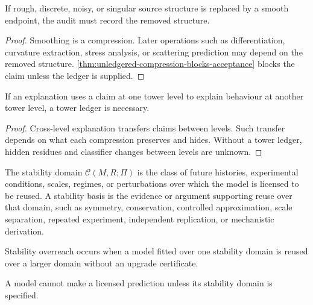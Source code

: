 \begin{corollary}
\label{cor:smooth-endpoints-source-ledgers}
If rough, discrete, noisy, or singular source structure is replaced by a smooth endpoint, the audit must record the removed structure.
\end{corollary}

\begin{proof}
Smoothing is a compression. Later operations such as differentiation, curvature extraction, stress analysis, or scattering prediction may depend on the removed structure. \autoref{thm:unledgered-compression-blocks-acceptance} blocks the claim unless the ledger is supplied.
\end{proof}

\begin{theorem}
\label{thm:tower-ledger-necessary-cross-level-explanation}
If an explanation uses a claim at one tower level to explain behaviour at another tower level, a tower ledger is necessary.
\end{theorem}

\begin{proof}
Cross-level explanation transfers claims between levels. Such transfer depends on what each compression preserves and hides. Without a tower ledger, hidden residues and classifier changes between levels are unknown.
\end{proof}

\begin{definition}
\label{def:stability-domain-basis}
The stability domain $\mathcal C(M,R;\Pi)$ is the class of future histories, experimental conditions, scales, regimes, or perturbations over which the model is licensed to be reused. A stability basis is the evidence or argument supporting reuse over that domain, such as symmetry, conservation, controlled approximation, scale separation, repeated experiment, independent replication, or mechanistic derivation.
\end{definition}

\begin{definition}
\label{def:stability-overreach}
Stability overreach occurs when a model fitted over one stability domain is reused over a larger domain without an upgrade certificate.
\end{definition}

\begin{theorem}
\label{thm:prediction-requires-stability-domain-audit}
A model cannot make a licensed prediction unless its stability domain is specified.
\end{theorem}

